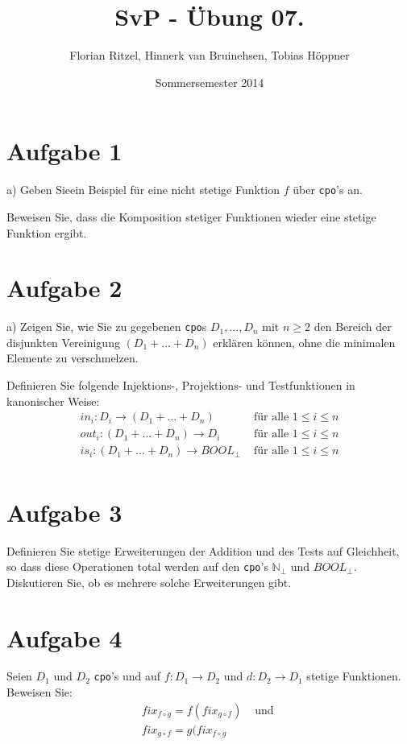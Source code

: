 \documentclass[ngerman,a4paper]{report}
\author{Florian Ritzel, Hinnerk van Bruinehsen, Tobias Höppner}
\title{SvP - Übung 07. }
\date{Sommersemester 2014}
\renewcommand{\maketitle}{}
\begin{document}
\maketitle
\section*{Aufgabe 1}
\begin{compactenum}
\item[a)] Geben Sieein Beispiel für eine nicht stetige Funktion $f$ über \lstinline{cpo}'s an.\\
\item[b)] Beweisen Sie, dass die Komposition stetiger Funktionen wieder eine stetige Funktion ergibt.\\
\end{compactenum}
\section*{Aufgabe 2}
\begin{compactenum}
\item[a)] Zeigen Sie, wie Sie zu gegebenen \lstinline{cpo}s $D_1,...,D_n$ mit $n\geq 2$ den Bereich der disjunkten Vereinigung $(D_1 + ... + D_n)$ erklären können, ohne die minimalen Elemente zu verschmelzen.\\
\item[b)] Definieren Sie folgende Injektions-, Projektions- und Testfunktionen in kanonischer Weise:\\
	\begin{align*}
		in_i: D_i \rightarrow (D_1+...+D_n)& \text{ für alle } 1\leq i\leq n\\
		out_i: (D_1+...+D_n)\rightarrow D_i& \text{ für alle } 1\leq i\leq n\\
		is_i: (D_1+...+D_n)\rightarrow BOOL_\bot& \text{ für alle } 1\leq i\leq n\\
	\end{align*}
\end{compactenum}
\section*{Aufgabe 3}
Definieren Sie stetige Erweiterungen der Addition und des Tests auf Gleichheit, so dass diese Operationen total werden auf den \lstinline{cpo}'s $\mathbb{N}_\bot$ und $BOOL_\bot$. Diskutieren Sie, ob es mehrere solche Erweiterungen gibt.
\section*{Aufgabe 4}
Seien $D_1$ und $D_2$ \lstinline{cpo}'s und auf $f:D_1\rightarrow D_2$ und $d:D_2 \rightarrow D_1$ stetige Funktionen.\\
Beweisen Sie:\\
\begin{align*}
	fix_{f\circ g} = f(fix_{g \circ f})& \text{ und }\\
	fix_{g\circ f} = g(fix_{f\circ g}&\\
\end{align*}
\end{document}
